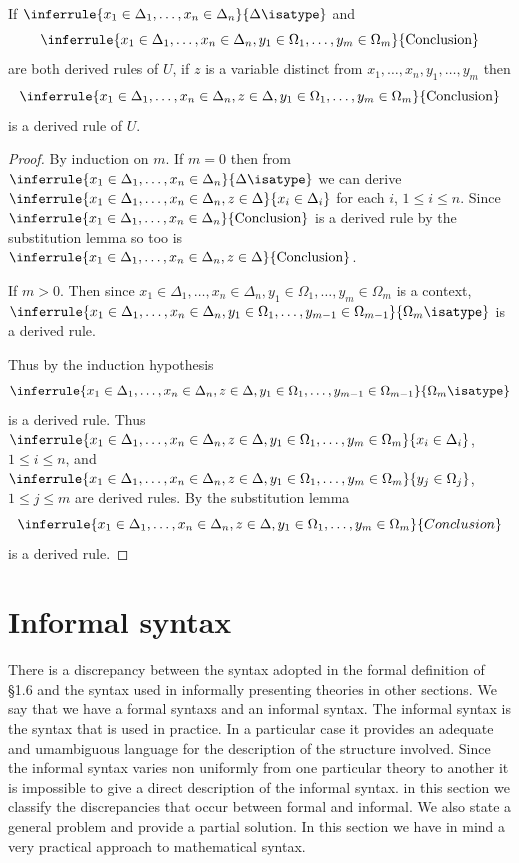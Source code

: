 \begin{lemma}[4]
  If $\inferrule{x_1\in\Delta_1,\ldots,x_n\in\Delta_n}{\Delta\isatype}$ and
  \[\inferrule{x_1\in\Delta_1,\ldots,x_n\in\Delta_n,y_1\in\Omega_1,\ldots,y_m\in\Omega_m}{\text{Conclusion}}\] are both derived rules of $U$, if $z$ is a variable distinct from $x_1,\ldots,x_n,y_1,\ldots,y_m$ then
  \[\inferrule{x_1\in\Delta_1,\ldots,x_n\in\Delta_n,z\in\Delta,y_1\in\Omega_1,\ldots,y_m\in\Omega_m}{\text{Conclusion}}\] is a derived rule of $U$.
\end{lemma}
\begin{proof}
  By induction on $m$.
  If $m=0$ then from $\inferrule{x_1\in\Delta_1,\ldots,x_n\in\Delta_n}{\Delta\isatype}$ we can derive $\inferrule{x_1\in\Delta_1,\ldots,x_n\in\Delta_n,z\in\Delta}{x_i\in\Delta_i}$ for each $i$, $1\leq i\leq n$.
  Since $\inferrule{x_1\in\Delta_1,\ldots,x_n\in\Delta_n}{\text{Conclusion}}$ is a derived rule by the substitution lemma so too is $\inferrule{x_1\in\Delta_1,\ldots,x_n\in\Delta_n,z\in\Delta}{\text{Conclusion}}$.

  If $m>0$.
  Then since $x_1\in\Delta_1,\ldots,x_n\in\Delta_n, y_1\in\Omega_1,\ldots,y_m\in\Omega_m$ is a context, $\inferrule{x_1\in\Delta_1,\ldots,x_n\in\Delta_n,y_1\in\Omega_1,\ldots,y_{m-1}\in\Omega_{m-1}}{\Omega_m\isatype}$ is a derived rule.

  Thus by the induction hypothesis
  \[\inferrule{x_1\in\Delta_1,\ldots,x_n\in\Delta_n,z\in\Delta,y_1\in\Omega_1,\ldots,y_{m-1}\in\Omega_{m-1}}{\Omega_m\isatype}\] is a derived rule.
  Thus $\inferrule{x_1\in\Delta_1,\ldots,x_n\in\Delta_n,z\in\Delta,y_1\in\Omega_1,\ldots,y_m\in\Omega_m}{x_i\in\Delta_i}$, $1\leq i\leq n$, and $\inferrule{x_1\in\Delta_1,\ldots,x_n\in\Delta_n,z\in\Delta,y_1\in\Omega_1,\ldots,y_m\in\Omega_m}{y_j\in\Omega_j}$, $1\leq j\leq m$ are derived rules.
  By the substitution lemma
  \[\inferrule{x_1\in\Delta_1,\ldots,x_n\in\Delta_n,z\in\Delta,y_1\in\Omega_1,\ldots,y_m\in\Omega_m}{Conclusion}\] is a derived rule.
\end{proof}

\section{Informal syntax} \label{sec:source-1-8}

There is a discrepancy between the syntax adopted in the formal definition of \S 1.6 and the syntax used in informally presenting theories in other sections. We say that we have a formal syntaxs and an informal syntax.
%
The informal syntax is the syntax that is used in practice. In a particular case it provides an adequate and umambiguous language for the description of the structure involved.
%
Since the informal syntax varies non uniformly from one particular theory to another it is impossible to give a direct description of the informal syntax. in this section we classify the discrepancies that occur between formal and informal.
%
We also state a general problem and provide a partial solution.
%
In this section we have in mind a very practical approach to mathematical syntax.

